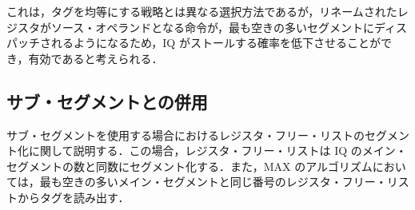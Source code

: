 これは，タグを均等にする戦略とは異なる選択方法であるが，リネームされたレジスタがソース・オペランドとなる命令が，最も空きの多いセグメントにディスパッチされるようになるため，IQ がストールする確率を低下させることができ，有効であると考えられる．

\subsection{サブ・セグメントとの併用}
サブ・セグメントを使用する場合におけるレジスタ・フリー・リストのセグメント化に関して説明する．この場合，レジスタ・フリー・リストは IQ のメイン・セグメントの数と同数にセグメント化する．また，MAX のアルゴリズムにおいては，最も空きの多いメイン・セグメントと同じ番号のレジスタ・フリー・リストからタグを読み出す．